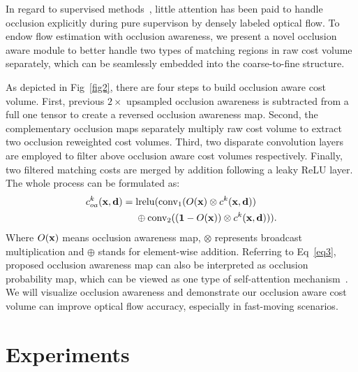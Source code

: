 \documentclass{article}
\begin{document}
In regard to supervised methods~\cite{Fischer2015FlowNetLO,Ilg2017FlowNet2E,Ranjan_2017_CVPR,Sun_2018_CVPR,Hui_2018_CVPR,Yin_2019_CVPR,Kong_2020,Lu_2020_WACV}, little attention has been paid to handle occlusion explicitly during pure supervison by densely labeled optical flow. To endow flow estimation with occlusion awareness, we present a novel occlusion aware module to better handle two types of matching regions in raw cost volume separately, which can be seamlessly embedded into the coarse-to-fine structure.

As depicted in Fig~\ref{fig2}, there are four steps to build occlusion aware cost volume. First, previous $2\times$ upsampled occlusion awareness is subtracted from a full one tensor to create a reversed occlusion awareness map. Second, the complementary occlusion maps separately multiply raw cost volume to extract two occlusion reweighted cost volumes. Third, two disparate convolution layers are employed to filter above occlusion aware cost volumes respectively. Finally, two filtered matching costs are merged by addition following a leaky ReLU layer. The whole process can be formulated as:
\begin{equation}
\begin{split}
c_{oa}^k({\bf x}, {\bf d}) = \; & {\rm lrelu}({\rm conv_{1}}(O({\bf x}) \otimes c^k({\bf x}, {\bf d})) \\
& \oplus {\rm conv_{2}}(({\bf 1} - O({\bf x})) \otimes c^k({\bf x}, {\bf d}))).
\label{eq3}
\end{split}
\end{equation}
Where $O(\bf x)$ means occlusion awareness map, $\otimes$ represents broadcast multiplication and $\oplus$ stands for element-wise addition. Referring to Eq~\ref{eq3}, proposed occlusion awareness map can also be interpreted as occlusion probability map, which can be viewed as one type of self-attention mechanism~\cite{NIPS2017_7181}. We will visualize occlusion awareness and demonstrate our occlusion aware cost volume can improve optical flow accuracy, especially in fast-moving scenarios.


\section{Experiments}
\end{document}
